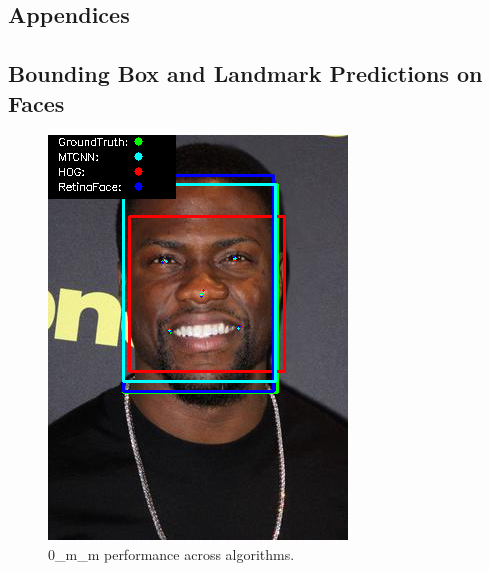 \documentclass{l4proj}
\begin{document}
\begin{appendices}

\chapter{Appendices}
\section{Bounding Box and Landmark Predictions on Faces}
\begin{figure}[h!]
  \centering
  \begin{minipage}{0.49\textwidth}
    \centering
     \includegraphics[width=\textwidth]{images/appendix/0.png}
    \caption{0\_m\_m performance across algorithms.}
    \label{whoopi_result}
  \end{minipage}
    \hfill
    \begin{minipage}{0.49\textwidth}
    \centering

\end{minipage}
\end{figure}
\end{appendices}
\end{document}
